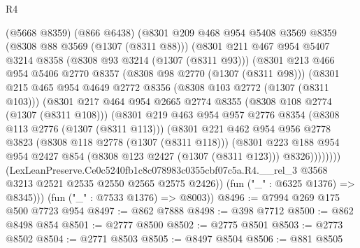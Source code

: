 \begin{lexlean}{R4}
\begin{coremodule}
            (@5668 @8359)
            (@866 @6438)
            (@8301
              @209
              @468
              @954
              @5408
              @3569
              @8359
              (@8308 @88 @3569 (@1307 (@8311 @88)))
              (@8301
                @211
                @467
                @954
                @5407
                @3214
                @8358
                (@8308 @93 @3214 (@1307 (@8311 @93)))
                (@8301
                  @213
                  @466
                  @954
                  @5406
                  @2770
                  @8357
                  (@8308 @98 @2770 (@1307 (@8311 @98)))
                  (@8301
                    @215
                    @465
                    @954
                    @4649
                    @2772
                    @8356
                    (@8308 @103 @2772 (@1307 (@8311 @103)))
                    (@8301
                      @217
                      @464
                      @954
                      @2665
                      @2774
                      @8355
                      (@8308 @108 @2774 (@1307 (@8311 @108)))
                      (@8301
                        @219
                        @463
                        @954
                        @957
                        @2776
                        @8354
                        (@8308 @113 @2776 (@1307 (@8311 @113)))
                        (@8301
                          @221
                          @462
                          @954
                          @956
                          @2778
                          @3823
                          (@8308 @118 @2778 (@1307 (@8311 @118)))
                          (@8301
                            @223
                            @188
                            @954
                            @954
                            @2427
                            @854
                            (@8308 @123 @2427 (@1307 (@8311 @123)))
                            @8326))))))))
            (LexLeanPreserve.Ce0c5240fb1c8c078983c0355cbf07c5a.R4.__rel_3
              @3568
              @3213
              @2521
              @2535
              @2550
              @2565
              @2575
              @2426))
          (fun ("_" : @6325 @1376) => @8345)))
      (fun ("_" : @7533 @1376) => @8003))
@8496 := @7994 @269 @175 @500 @7723 @954
@8497 := @862 @7888
@8498 := @398 @7712
@8500 := @862 @8498 @854
@8501 := @2777 @8500
@8502 := @2775 @8501
@8503 := @2773 @8502
@8504 := @2771 @8503
@8505 := @8497 @8504
@8506 := @881 @8505

\end{coremodule}
\end{lexlean}

